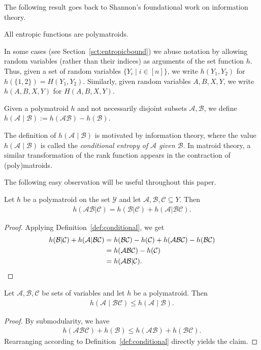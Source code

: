 \documentclass[a4paper,cleveref]{lipics-v2021}
\newcommand{\vset}[1]{\mathcal{#1}}
\begin{document}
%
The following result goes back to Shannon's foundational work on information theory.
\begin{theorem}\cite{Shannon48}\label{thm:shannon}
	All entropic functions are polymatroids.
\end{theorem}
%
In some cases (see Section~\ref{sct:entropicbound}) we abuse notation by allowing random variables (rather than their indices) as arguments of the set function $h$. 
Thus, given a set of random variables $\{Y_i \mid i \in [n]\}$, we write $h(Y_1,Y_2)$ for $h(\{1,2\})=H(Y_1,Y_2)$. 
Similarly, given random variables $A,B,X,Y$, we write $h(A,B,X,Y)$ for $H(A,B,X,Y)$.

\begin{definition}\label{def:conditional}
Given a polymatroid $h$ and not necessarily disjoint subsets $\vset A, \vset B$, we define $h(\vset A\mid \vset B) := h(\vset A\vset B) - h(\vset B)$.
\end{definition}
\begin{remark}
The definition of $h(\vset A\mid \vset B)$ is motivated by information theory, where the value $h(\vset A\mid \vset B)$ is called the \emph{conditional entropy of $\vset A$ given $\vset B$}.
In matroid theory, a similar transformation of the rank function appears in the contraction of (poly)matroids.
	\end{remark}

The following easy observation will be useful throughout this paper.

\begin{observation}
\label{obs:chainrule}
	Let $h$ be a polymatroid on the set $\vset Y$ and let $\vset A, \vset B, \vset C\subseteq Y$. Then 
	\begin{align*}
		h(\vset A\vset B|\vset C) = h(\vset B|\vset C) + h(\vset A|\vset B \vset C).
	\end{align*}
\end{observation}
\begin{proof}
	Applying Definition~\ref{def:conditional}, we get
	\begin{align*}
		h(\vset B|\vset C) + h(\vset A|\vset B \vset C) &= h(\vset B \vset C) - h(\vset C) + h(\vset A \vset B \vset C) - h(\vset B \vset C)\\
		&= h(\vset A\vset B \vset C) - h(\vset C) \\
		&= h(\vset A\vset B |\vset C).\qedhere
	\end{align*}
\end{proof}
\begin{observation}\label{obs:moreconditioned}
	Let $\vset A, \vset B, \vset C$ be sets of variables and let $h$ be a polymatroid. Then
	\begin{align*}
		h(\vset A\mid \vset B\vset C) \le h(\vset A \mid \vset B).
	\end{align*}
\end{observation}
\begin{proof}
	By submodularity, we have
	\begin{align*}
		h(\vset A \vset B \vset C) + h(\vset B) \le h(\vset A\vset B) +h(\vset B\vset C).
	\end{align*}
	Rearranging according to Definition~\ref{def:conditional} directly yields the claim.
\end{proof}
\end{document}
